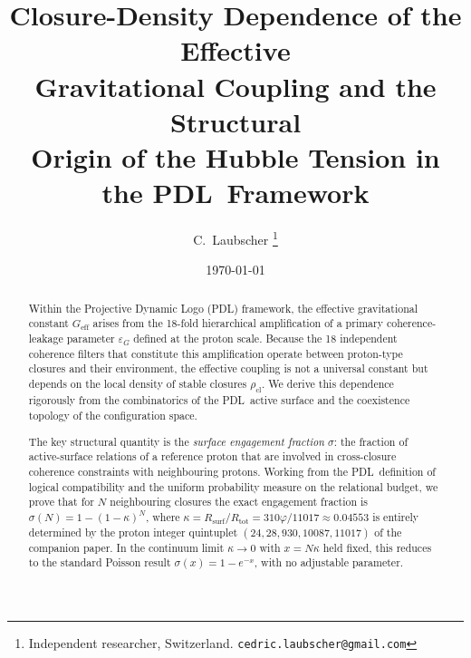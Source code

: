 \documentclass[11pt,a4paper]{article}
\theoremstyle{definition}
\newcommand{\PDL}{\textnormal{PDL}}
\newcommand{\Rsurf}{R_{\mathrm{surf}}}
\newcommand{\Rtot}{R_{\mathrm{tot}}}
\newcommand{\epsg}{\varepsilon_G}
\newcommand{\Geff}{G_{\mathrm{eff}}}
\newcommand{\vp}{\varphi}
\newcommand{\kap}{\kappa}
\newcommand{\sig}{\sigma}
\newcommand{\rhocl}{\rho_{\mathrm{cl}}}
\begin{document}
\title{%
  Closure-Density Dependence of the Effective\\[4pt]
  Gravitational Coupling and the Structural\\[4pt]
  Origin of the Hubble Tension in the \PDL\ Framework%
}
\author{%
  C.~Laubscher%
  \thanks{Independent researcher, Switzerland. \texttt{cedric.laubscher@gmail.com}}\\[4pt]%
}
\date{\small \today}
\maketitle

\begin{abstract}
Within the Projective Dynamic Logo (\PDL) framework, the effective gravitational constant $\Geff$ arises from the 18-fold hierarchical amplification of a primary coherence-leakage parameter $\epsg$ defined at the proton scale. Because the 18 independent coherence filters that constitute this amplification operate between proton-type closures and their environment, the effective coupling is not a universal constant but depends on the local density of stable closures $\rhocl$. We derive this dependence rigorously from the combinatorics of the \PDL\ active surface and the coexistence topology of the configuration space.

The key structural quantity is the \emph{surface engagement fraction} $\sig$: the fraction of active-surface relations of a reference proton that are involved in cross-closure coherence constraints with neighbouring protons. Working from the \PDL\ definition of logical compatibility and the uniform probability measure on the relational budget, we prove that for $N$ neighbouring closures the exact engagement fraction is $\sig(N) = 1 - (1-\kap)^N$, where $\kap = \Rsurf/\Rtot = 310\vp/11017 \approx 0.04553$ is entirely determined by the proton integer quintuplet $(24,28,930,10087,11017)$ of the companion paper. In the continuum limit $\kap \to 0$ with $x = N\kap$ held fixed, this reduces to the standard Poisson result $\sig(x) = 1 - e^{-x}$, with no adjustable parameter.


\end{abstract}
\end{document}
